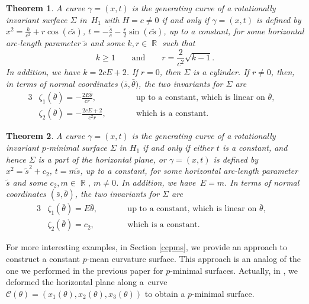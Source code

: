 \documentclass[10pt,a4paper]{amsart}
\numberwithin{equation}{section}
\newtheorem{theoremA}{Theorem}
\DeclareMathOperator{\R}{\mathbb R}
\begin{document}
\begin{theoremA}\label{TheoremA}
A curve $\gamma=(x,t)$ is the generating curve of a rotationally invariant surface $\Sigma$ in~$H_{1}$ with $H=c\neq 0$
if and only if $\gamma=(x,t)$ is defined by
$x^{2}=\frac{k}{c^2}+r\cos{(c\tilde{s})}$, $t=-\frac{\tilde{s}}{c}-\frac{r}{2}\sin{(c\tilde{s})}$, up to a constant,
for some horizontal arc-length parameter $\tilde{s}$ and some $k, r\in\R$ such that
\begin{equation*}
k\geq 1\qquad \textrm{and}\qquad r=\frac{2}{c^2}\sqrt{k-1}.
\end{equation*} In addition, we have
$k=2cE+2$. If $r=0$, then $\Sigma$ is a cylinder. If $r\neq 0$, then, in terms of normal coordinates $\bigl(\bar s,\bar\theta\bigr)$, the two invariants for $\Sigma$ are
\begin{alignat*}{3}
&\zeta_{1}(\bar{\theta})=-\frac{2E\bar\theta}{cr},\qquad && \textrm{up to a constant, which is linear on $\bar\theta$}, &\\
& \zeta_{2}(\bar{\theta})=-\frac{2cE+2}{c^{2}r},\qquad&& \textrm{which is a constant}.&
\end{alignat*}
\end{theoremA}
\begin{theoremA}\label{TheoremB}
A curve $\gamma=(x,t)$ is the generating curve of a rotationally invariant $p$-minimal surface $\Sigma$ in $H_{1}$ if and only if either $t$ is a constant, and hence $\Sigma$ is a part of the horizontal plane, or $\gamma=(x,t)$ is defined by
$
x^{2}=\tilde{s}^{2}+c_2$, $
t=m\tilde{s}$, up to a constant,
for some horizontal arc-length parameter $\tilde{s}$ and some $c_2, m\in\R,\ m\neq 0$. In addition, we have~${
E=m}$.
In terms of normal coordinates $(\bar s,\bar\theta)$, the two invariants for $\Sigma$ are
\begin{alignat*}{3}
& \zeta_{1}(\bar{\theta})=E\bar\theta,\qquad && \textrm{up to a constant, which is linear on $\bar\theta$},& \\
&\zeta_{2}(\bar{\theta})=c_{2},\qquad && \textrm{which is a constant}.&
\end{alignat*}
\end{theoremA}
For more interesting examples, in Section \ref{ccpms}, we provide an approach to construct a constant $p$-mean curvature surface. This approach is an analog of the one we performed in the previous paper \cite{ChiuH/LiuH:2022} for $p$-minimal surfaces. Actually, in \cite{ChiuH/LiuH:2022}, we deformed the horizontal plane along a~curve~${\mathcal{C}(\theta)=(x_{1}(\theta), x_{2}(\theta), x_{3}(\theta))}$ to obtain a $p$-minimal surface.
\end{document}
